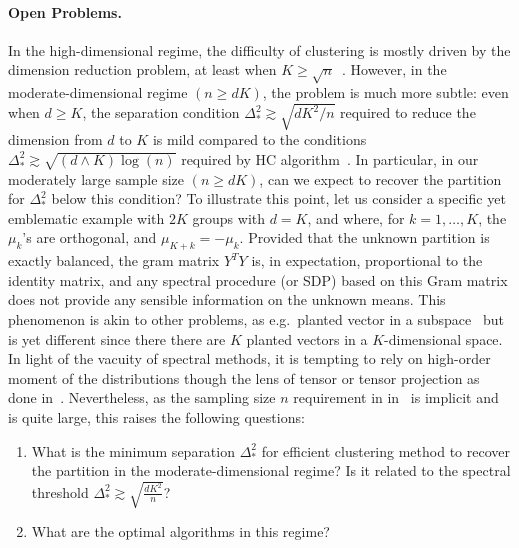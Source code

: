 \documentclass{article}
\begin{document}
\paragraph{Open Problems.} In the high-dimensional regime, the difficulty of clustering is mostly driven by the dimension reduction problem, at least when $K\geq \sqrt{n}$~\cite{Even25}. 
However, in the moderate-dimensional regime $(n\geq dK)$, the problem is much more subtle: even when $d\geq K$, the separation condition $\Delta_*^2\gtrsim \sqrt{dK^2/n}$ required to reduce the dimension from $d$ to $K$ is mild compared to the conditions $\Delta_*^2\gtrsim \sqrt{(d\wedge K)\log(n)}$ required by  HC algorithm~\cite{Even25,VEMPALA2004}. 
In particular, in our moderately large sample size $(n\geq dK)$, can we expect to recover the partition for $\Delta_*^2$ below this condition?  To illustrate this point, let us consider a specific yet emblematic example with $2K$ groups with $d=K$, and where, for $k=1,\ldots, K$, the $\mu_k$'s are orthogonal, and $\mu_{K+k}= - \mu_k$. Provided that the unknown partition is exactly balanced, the gram matrix $Y^{T}Y$ is, in expectation, proportional to the identity matrix, and any spectral procedure (or SDP) based on this Gram matrix does not provide any sensible information on the unknown means. This phenomenon is akin to other problems, as  e.g.~planted vector in a subspace~\cite{mao2025optimal} but is yet different since there there are $K$ planted vectors in a $K$-dimensional space. In light of the vacuity of spectral methods, it is tempting to rely on high-order moment of the distributions though the lens of tensor or tensor projection as done in~\cite{LiuLi2022}. Nevertheless, as the sampling size $n$ requirement in in~\cite{LiuLi2022} is implicit and is quite large, this raises the following questions:
\begin{enumerate}
    \item What is the minimum separation $\Delta_*^2$ for efficient clustering method to recover the partition in the moderate-dimensional regime?  Is it related to the spectral threshold 
    $\Delta_*^2 \gtrsim \sqrt{\frac{dK^2}{n}}$? 
    \item What are the optimal algorithms in this regime? 
\end{enumerate}
\end{document}
